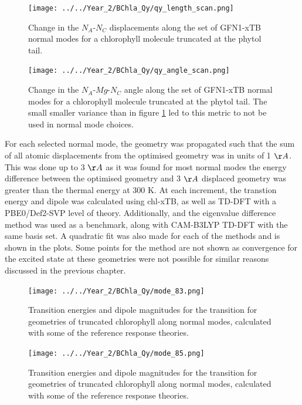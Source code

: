 \begin{figure}
    \centering
    \texttt{[image: ../../Year\_2/BChla\_Qy/qy\_length\_scan.png]}
    \label{fig:qy_length_scan}
    \caption{Change in the $N_A$-$N_C$ displacements along the set of GFN1-xTB 
    normal modes for a chlorophyll molecule truncated at the phytol tail.}
\end{figure}

\begin{figure}
    \centering
    \texttt{[image: ../../Year\_2/BChla\_Qy/qy\_angle\_scan.png]}
    \label{fig:qy_angle_scan}
    \caption{Change in the $N_A$-$Mg$-$N_C$ angle along the set of GFN1-xTB normal
    modes for a chlorophyll molecule truncated at the phytol tail. The small smaller
    variance than in figure \ref{fig:qy_length_scan} led to this metric to not be
    used in normal mode choices.}
\end{figure}

For each selected normal mode, the geometry was propagated such that the sum of
all atomic displacements from the optimised geometry was in units of 1 $\AA{}$.
This was done up to 3 $\AA{}$ as it was found for most normal modes the energy 
difference between the optimised geometry and 3 $\AA{}$ displaced geometry was greater
than the thermal energy at 300 K. At each increment, the \Qy transtion energy and
dipole was calculated using chl-xTB, as well as TD-DFT with a PBE0/Def2-SVP level
of theory. Additionally, \dscf and the eigenvalue difference method was used as 
a benchmark, along with CAM-B3LYP TD-DFT with the same basis set. A quadratic
fit was also made for each of the methods and is shown in the plots. Some points
for the \dscf method are not shown as convergence for the excited state at these
geometries were not possible for similar reasons discussed in the previous chapter.

\begin{figure}
    \centering
    \texttt{[image: ../../Year\_2/BChla\_Qy/mode\_83.png]}
    \label{fig:mode_83}
    \caption{Transition energies and dipole magnitudes for the \Qy transition for
    geometries of truncated chlorophyll along normal modes, calculated with some 
    of the reference response theories.}
\end{figure}

\begin{figure}
    \centering
    \texttt{[image: ../../Year\_2/BChla\_Qy/mode\_85.png]}
    \label{fig:mode_85}
    \caption{Transition energies and dipole magnitudes for the \Qy transition for
    geometries of truncated chlorophyll along normal modes, calculated with some 
    of the reference response theories.}
\end{figure}

